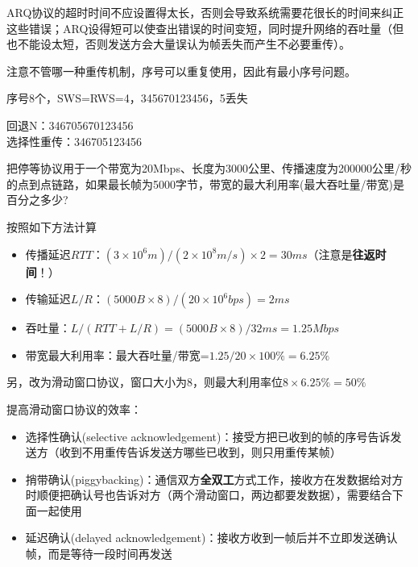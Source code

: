 \par ARQ协议的超时时间不应设置得太长，否则会导致系统需要花很长的时间来纠正这些错误；ARQ设得短可以使查出错误的时间变短，同时提升网络的吞吐量（但也不能设太短，否则发送方会大量误认为帧丢失而产生不必要重传）。


注意不管哪一种重传机制，序号可以重复使用，因此有最小序号问题。
\begin{example}
	序号8个，SWS=RWS=4，345670123456，5丢失
\end{example}
\begin{analysis}
	回退N：346705670123456\\
	选择性重传：346705123456
\end{analysis}
\begin{example}
	把停等协议用于一个带宽为20Mbps、长度为3000公里、传播速度为200000公里/秒的点到点链路，如果最长帧为5000字节，带宽的最大利用率(最大吞吐量/带宽)是百分之多少?
\end{example}
\begin{analysis}
	按照如下方法计算
	\begin{itemize}
		\item 传播延迟$RTT$：$(3\times 10^6 m) / (2\times 10^8 m/s)\times 2=30ms$（注意是\textbf{往返时间}！）
		\item 传输延迟$L/R$：$(5000B\times 8)/(20\times 10^6bps)=2ms$
		\item 吞吐量：$L/(RTT+L/R)=(5000B\times 8)/32ms=1.25Mbps$
		\item 带宽最大利用率：最大吞吐量/带宽=$1.25/20\times 100\%=6.25\%$
	\end{itemize}
	另，改为滑动窗口协议，窗口大小为8，则最大利用率位$8\times 6.25\%=50\%$
\end{analysis}

提高滑动窗口协议的效率：
\begin{itemize}
	\item 选择性确认(selective acknowledgement)：接受方把已收到的帧的序号告诉发送方（收到不用重传告诉发送方哪些已收到，则只用重传某帧）
	\item 捎带确认(piggybacking)：通信双方\textbf{全双工}方式工作，接收方在发数据给对方时顺便把确认号也告诉对方（两个滑动窗口，两边都要发数据），需要结合下面一起使用
	\item 延迟确认(delayed acknowledgement)：接收方收到一帧后并不立即发送确认帧，而是等待一段时间再发送
\end{itemize}

